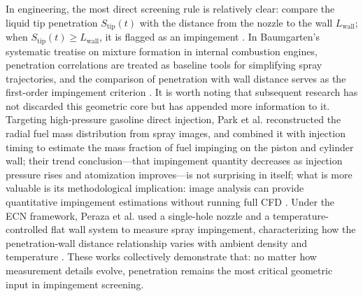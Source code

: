 In engineering, the most direct screening rule is relatively clear:
compare the liquid tip penetration $S_\mathrm{tip}(t)$ with the distance from the nozzle to the wall $L_\mathrm{wall}$; when \(S_\mathrm{tip}(t) \geq L_\mathrm{wall}\), it is flagged as an impingement \cite{Baumgarten2006MixFormation}.
In Baumgarten's systematic treatise on mixture formation in internal combustion engines, penetration correlations are treated as baseline tools for simplifying spray trajectories, and the comparison of penetration with wall distance serves as the first-order impingement criterion \cite{Baumgarten2006MixFormation}.
It is worth noting that subsequent research has not discarded this geometric core but has appended more information to it.
Targeting high-pressure gasoline direct injection, Park et al. reconstructed the radial fuel mass distribution from spray images,
and combined it with injection timing to estimate the mass fraction of fuel impinging on the piston and cylinder wall;
their trend conclusion---that impingement quantity decreases as injection pressure rises and atomization improves---is not surprising in itself; what is more valuable is its methodological implication:
image analysis can provide quantitative impingement estimations without running full CFD \cite{Park2018WallImpingement}.
Under the ECN framework, Peraza et al. used a single-hole nozzle and a temperature-controlled flat wall system to measure spray impingement, characterizing how the penetration-wall distance relationship varies with ambient density and temperature \cite{peraza2022swi}.
These works collectively demonstrate that:
no matter how measurement details evolve, penetration remains the most critical geometric input in impingement screening.

